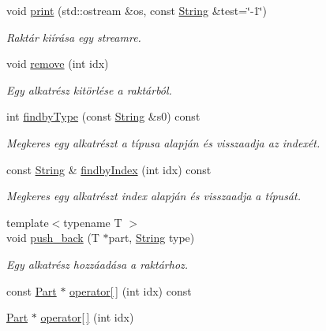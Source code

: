 \begin{DoxyCompactItemize}
void \mbox{\hyperlink{class_inventory_ae141405ba9deea67f5c1be1850d136fe}{print}} (std\+::ostream \&os, const \mbox{\hyperlink{class_string}{String}} \&test=\char`\"{}-\/1\char`\"{})
\begin{DoxyCompactList}\small\item\em Raktár kiírása egy streamre. \end{DoxyCompactList}\item 
void \mbox{\hyperlink{class_inventory_a1f602317e97625523444591ac5bf8bd7}{remove}} (int idx)
\begin{DoxyCompactList}\small\item\em Egy alkatrész kitörlése a raktárból. \end{DoxyCompactList}\item 
int \mbox{\hyperlink{class_inventory_a2a5998334229d148aac3e0dc16642480}{findby\+Type}} (const \mbox{\hyperlink{class_string}{String}} \&s0) const
\begin{DoxyCompactList}\small\item\em Megkeres egy alkatrészt a típusa alapján és visszaadja az indexét. \end{DoxyCompactList}\item 
const \mbox{\hyperlink{class_string}{String}} \& \mbox{\hyperlink{class_inventory_acb0afe61bcfc92a963f803f1b70676dc}{findby\+Index}} (int idx) const
\begin{DoxyCompactList}\small\item\em Megkeres egy alkatrészt index alapján és visszaadja a típusát. \end{DoxyCompactList}\item 
{\footnotesize template$<$typename T $>$ }\\void \mbox{\hyperlink{class_inventory_a86dd14362d6cefb46d4e40667c44481c}{push\+\_\+back}} (T $\ast$part, \mbox{\hyperlink{class_string}{String}} type)
\begin{DoxyCompactList}\small\item\em Egy alkatrész hozzáadása a raktárhoz. \end{DoxyCompactList}\item 
const \mbox{\hyperlink{class_part}{Part}} $\ast$ \mbox{\hyperlink{class_inventory_a99b8be25beb3530c47d1faa913633979}{operator\mbox{[}$\,$\mbox{]}}} (int idx) const
\item 
\mbox{\hyperlink{class_part}{Part}} $\ast$ \mbox{\hyperlink{class_inventory_a86601b8ee999e78cdeea83431bab8f33}{operator\mbox{[}$\,$\mbox{]}}} (int idx)
\end{DoxyCompactItemize}


